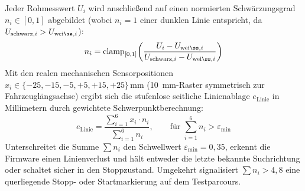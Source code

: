 Jeder Rohmesswert $U_i$ wird anschließend auf einen normierten Schwärzungsgrad $n_i \in [0, 1]$ abgebildet (wobei $n_i = 1$ einer dunklen Linie entspricht, da $U_{\mathrm{schwarz},i} > U_{\mathrm{wei\ss},i}$):
\begin{equation}
  n_i = \mathrm{clamp}_{[0, 1]}\!\left(\frac{U_i - U_{\mathrm{wei\ss},i}}{U_{\mathrm{schwarz},i} - U_{\mathrm{wei\ss},i}}\right)
  \label{eq:ls_norm}
\end{equation}
Mit den realen mechanischen Sensorpositionen $x_i \in \{-25, -15, -5, +5, +15, +25\}\,\mathrm{mm}$ (\qty{10}{\milli\meter}-Raster symmetrisch zur Fahrzeuglängsachse) ergibt sich die stufenlose seitliche Linienablage $e_{\mathrm{Linie}}$ in Millimetern durch gewichtete Schwerpunktberechnung:
\begin{equation}
  e_{\mathrm{Linie}} = \frac{\sum_{i=1}^{6} x_i \cdot n_i}{\sum_{i=1}^{6} n_i}, \qquad \text{für } \sum_{i=1}^{6} n_i > \varepsilon_{\min}
  \label{eq:ls_centroid}
\end{equation}
Unterschreitet die Summe $\sum n_i$ den Schwellwert $\varepsilon_{\min} = 0{,}35$, erkennt die Firmware einen Linienverlust und hält entweder die letzte bekannte Suchrichtung oder schaltet sicher in den Stoppzustand. Umgekehrt signalisiert $\sum n_i > 4{,}8$ eine querliegende Stopp- oder Startmarkierung auf dem Testparcours.
